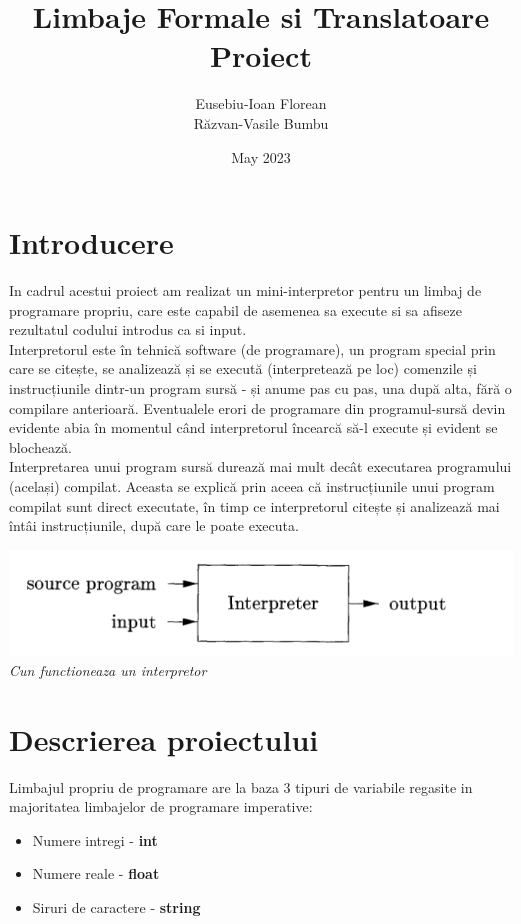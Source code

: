\documentclass{article}
\title{Limbaje Formale si Translatoare
\\
Proiect}
\author{Eusebiu-Ioan Florean
\\
Răzvan-Vasile Bumbu}
\date{May 2023}
\begin{document}
\maketitle

\newpage

\tableofcontents
\newpage
\large 

\section{Introducere}
In cadrul acestui proiect am realizat un mini-interpretor pentru un limbaj de programare propriu, care este capabil de asemenea sa execute si sa afiseze rezultatul codului introdus ca si input. \\

Interpretorul este în tehnică software (de programare), un program special prin care se citește, se analizează și se execută (interpretează pe loc) comenzile și instrucțiunile dintr-un program sursă - și anume pas cu pas, una după alta, fără o compilare anterioară. Eventualele erori de programare din programul-sursă devin evidente abia în momentul când interpretorul încearcă să-l execute și evident se blochează. \\

Interpretarea unui program sursă durează mai mult decât executarea programului (același) compilat. Aceasta se explică prin aceea că instrucțiunile unui program compilat sunt direct executate, în timp ce interpretorul citește și analizează mai întâi instrucțiunile, după care le poate executa.

\begin{center}
\includegraphics[]{interpretor.png}\\
\textit{Cun functioneaza un interpretor}
\end{center}


\section{Descrierea proiectului}

Limbajul propriu de programare are la baza 3 tipuri de variabile regasite in majoritatea limbajelor de programare imperative:
\begin{itemize}
    \item Numere intregi - \textbf{int}
    \item Numere reale - \textbf{float}
    \item Siruri de caractere - \textbf{string}\\
\end{itemize}
\end{document}
